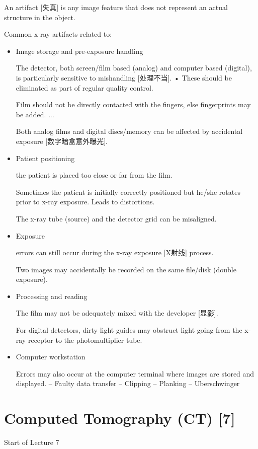 \documentclass[UTF8,a4paper,11pt]{book}
\theoremstyle{mystyle}{
  \newtheorem{example}{Example}
}
\begin{document}
An artifact [失真] is any image feature that does not
represent an actual structure in the object.

Common x-ray artifacts related to:
\begin{itemize}
\item Image storage and pre-exposure handling

The detector, both screen/film based (analog)
and computer based (digital), is particularly
sensitive to mishandling [处理不当].
• These should be eliminated as part of regular
quality control.

 Film should not be directly contacted with the
fingers, else fingerprints may be added. ...

Both analog films and digital discs/memory
can be affected by accidental exposure [数字暗盒意外曝光].


\item Patient positioning

 the patient
is placed too close or
far from the film.

Sometimes the patient
is initially correctly
positioned but he/she
rotates prior to x-ray
exposure. Leads to distortions.

The x-ray tube (source) and the detector grid
can be misaligned.

\item Exposure

errors
can still occur during the x-ray exposure [X射线]
process.

 Two images may accidentally be recorded on
the same file/disk (double exposure).


\item Processing and reading

The film may not be adequately mixed with
the developer [显影].

For digital detectors, dirty light guides may
obstruct light going from the x-ray receptor to
the photomultiplier tube.


\item Computer workstation

 Errors may also occur at the computer
terminal where images are stored and
displayed.
– Faulty data transfer
– Clipping
– Planking
– Uberschwinger


\end{itemize}



\chapter{Computed Tomography (CT) [7]}
{\sf Start of Lecture 7}
\end{document}
